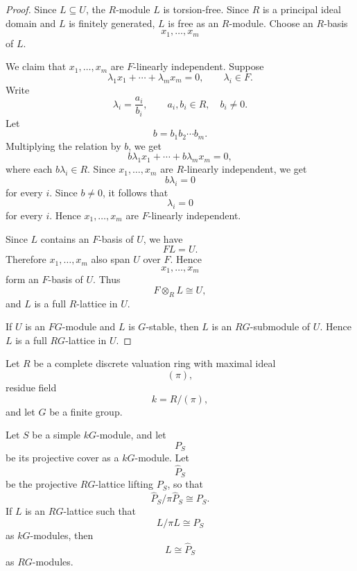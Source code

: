 \begin{proof}
    Since \(L\subseteq U\), the \(R\)-module \(L\) is torsion-free. Since \(R\) is a
    principal ideal domain and \(L\) is finitely generated, \(L\) is free as an
    \(R\)-module. Choose an \(R\)-basis
    \[
        x_1,\ldots,x_m
    \]
    of \(L\).

    We claim that \(x_1,\ldots,x_m\) are \(F\)-linearly independent. Suppose
    \[
        \lambda_1x_1+\cdots+\lambda_mx_m=0,
        \qquad
        \lambda_i\in F.
    \]
    Write
    \[
        \lambda_i=\frac{a_i}{b_i},
        \qquad
        a_i,b_i\in R,\quad b_i\neq 0.
    \]
    Let
    \[
        b=b_1b_2\cdots b_m.
    \]
    Multiplying the relation by \(b\), we get
    \[
        b\lambda_1x_1+\cdots+b\lambda_mx_m=0,
    \]
    where each \(b\lambda_i\in R\). Since \(x_1,\ldots,x_m\) are \(R\)-linearly
    independent, we get
    \[
        b\lambda_i=0
    \]
    for every \(i\). Since \(b\neq 0\), it follows that
    \[
        \lambda_i=0
    \]
    for every \(i\). Hence \(x_1,\ldots,x_m\) are \(F\)-linearly independent.

    Since \(L\) contains an \(F\)-basis of \(U\), we have
    \[
        FL=U.
    \]
    Therefore \(x_1,\ldots,x_m\) also span \(U\) over \(F\). Hence
    \[
        x_1,\ldots,x_m
    \]
    form an \(F\)-basis of \(U\). Thus
    \[
        F\otimes_R L\cong U,
    \]
    and \(L\) is a full \(R\)-lattice in \(U\).

    If \(U\) is an \(FG\)-module and \(L\) is \(G\)-stable, then \(L\) is an
    \(RG\)-submodule of \(U\). Hence \(L\) is a full \(RG\)-lattice in \(U\).
\end{proof}

\begin{proposition}
    Let \(R\) be a complete discrete valuation ring with maximal ideal
    \[
        (\pi),
    \]
    residue field
    \[
        k=R/(\pi),
    \]
    and let \(G\) be a finite group.

    Let \(S\) be a simple \(kG\)-module, and let
    \[
        P_S
    \]
    be its projective cover as a \(kG\)-module. Let
    \[
        \widehat P_S
    \]
    be the projective \(RG\)-lattice lifting \(P_S\), so that
    \[
        \widehat P_S/\pi\widehat P_S\cong P_S.
    \]
    If \(L\) is an \(RG\)-lattice such that
    \[
        L/\pi L\cong P_S
    \]
    as \(kG\)-modules, then
    \[
        L\cong \widehat P_S
    \]
    as \(RG\)-modules.
\end{proposition}

